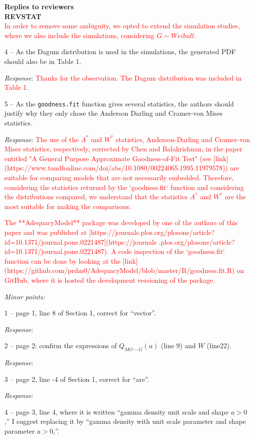 \documentclass[version=last,12pt,{"/home/prdm0/R/x86_64-pc-linux-gnu-library/4.2/komaletter/rmarkdown/templates/pdf/resources/maintainersDelight"},letterpaper,]{scrlttr2}
\begin{document}
\begin{letter}{\textbf{Replies to reviewers}\\\textbf{REVSTAT}\\}
\textcolor{red}{In order to remove some ambiguity, we opted to extend the simulation studies, where we also include the simulations, considering $G\sim Weibull$.}

4 -- As the Dagum distribution is used in the simulations, the generated
PDF should also be in Table 1.

\emph{Response}:
\textcolor{red}{Thanks for the observation. The Dagum distribution was included in Table 1.}

5 -- As the \texttt{goodness.fit} function gives several statistics, the
authors should justify why they only chose the Anderson Darling and
Cramer-von Mises statistics.

\emph{Response}:
\textcolor{red}{The use of the $A^*$ and $W^*$ statistics, Anderson-Darling and Cramer-von Mises statistics, respectively, corrected by Chen and Balakrishnan, in the paper entitled "A General Purpose Approximate Goodness-of-Fit Test" (see [link](https://www.tandfonline.com/doi/abs/10.1080/00224065.1995.11979578)) are suitable for comparing models that are not necessarily embedded. Therefore, considering the statistics returned by the `goodness.fit` function and considering the distributions compared, we understand that the statistics $A^*$ and $W^*$ are the most suitable for making the comparisons.}

\textcolor{red}{The **AdequacyModel** package was developed by one of the authors of this paper and was published at [https://journals.plos.org/plosone/article?id=10.1371/journal.pone.0221487](https://journals .plos.org/plosone/article?id=10.1371/journal.pone.0221487). A code inspection of the `goodness.fit` function can be done by looking at the [link](https://github.com/prdm0/AdequacyModel/blob/master/R/goodness.fit.R) on GitHub, where it is hosted the development versioning of the package.}

\emph{Minor points:}

1 -- page 1, line 8 of Section 1, correct for ``vector''.

\emph{Response}:

2 -- page 2: confirm the expressions of \(Q_{MO-G}(u)\) (line 9) and
\(W\) (line22).

\emph{Response}:

3 -- page 2, line -4 of Section 1, correct for ``are''.

\emph{Response}:

4 -- page 3, line 4, where it is written ``gamma density unit scale and
shape \(a>0\),'' I suggest replacing it by ``gamma density with unit
scale parameter and shape parameter \(a>0\),''.


\end{letter}
\end{document}

